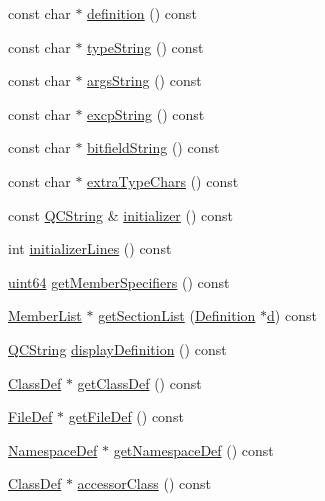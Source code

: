 \begin{DoxyCompactItemize}
const char $\ast$ \hyperlink{class_member_def_a7c48ff3755e4b40589656c9d444ffe13}{definition} () const 
\item 
const char $\ast$ \hyperlink{class_member_def_a7c36bc994bd4bd237a2c25092e0b1ab2}{type\+String} () const 
\item 
const char $\ast$ \hyperlink{class_member_def_aaab91f57760cf8cf83476a788d717277}{args\+String} () const 
\item 
const char $\ast$ \hyperlink{class_member_def_a61ea8868558b3a01891f77f3510c0be9}{excp\+String} () const 
\item 
const char $\ast$ \hyperlink{class_member_def_aabf2e3ca1a50cdc034f7644ec5c7c93a}{bitfield\+String} () const 
\item 
const char $\ast$ \hyperlink{class_member_def_a624c5926181e0b8b0375883fcf469075}{extra\+Type\+Chars} () const 
\item 
const \hyperlink{class_q_c_string}{Q\+C\+String} \& \hyperlink{class_member_def_ad2fa5ac9976418d1ea90ca63f9bcd9b4}{initializer} () const 
\item 
int \hyperlink{class_member_def_a4be58f15c5536291a33c94b9f40dcc6a}{initializer\+Lines} () const 
\item 
\hyperlink{qglobal_8h_a29940ae63ec06c9998bba873e25407ad}{uint64} \hyperlink{class_member_def_a1803a2a38a08219db25c71c899bdba67}{get\+Member\+Specifiers} () const 
\item 
\hyperlink{class_member_list}{Member\+List} $\ast$ \hyperlink{class_member_def_af4e0a4489c7c539ec4ad0bff46760157}{get\+Section\+List} (\hyperlink{class_definition}{Definition} $\ast$\hyperlink{060__command__switch_8tcl_af43f4b1f0064a33b2d662af9f06d3a00}{d}) const 
\item 
\hyperlink{class_q_c_string}{Q\+C\+String} \hyperlink{class_member_def_af65a2129b462a2fab54d6a4db6c3584d}{display\+Definition} () const 
\item 
\hyperlink{class_class_def}{Class\+Def} $\ast$ \hyperlink{class_member_def_a46f1d0cb36391190d33f8fe505564601}{get\+Class\+Def} () const 
\item 
\hyperlink{class_file_def}{File\+Def} $\ast$ \hyperlink{class_member_def_a4ab6237f4344fd12ad55b023b4979295}{get\+File\+Def} () const 
\item 
\hyperlink{class_namespace_def}{Namespace\+Def} $\ast$ \hyperlink{class_member_def_a27aaa75266f9cd0b1a4c017ba8e4ade5}{get\+Namespace\+Def} () const 
\item 
\hyperlink{class_class_def}{Class\+Def} $\ast$ \hyperlink{class_member_def_af79584d2c7b54643135cc71aaa3e9309}{accessor\+Class} () const 

\end{DoxyCompactItemize}
